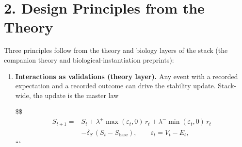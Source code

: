 \documentclass[
]{article}
\begin{document}
\section{2. Design Principles from the
Theory}\label{design-principles-from-the-theory}

Three principles follow from the theory and biology layers of the stack
(the companion theory and biological-instantiation preprints):

\begin{enumerate}
\def\labelenumi{\arabic{enumi}.}
\item
  \textbf{Interactions as validations (theory layer).} Any event with a
  recorded expectation and a recorded outcome can drive the stability
  update. Stack-wide, the update is the master law

  \$\$ \begin{equation}
  \begin{split} S_{t+1} ={}& S_t + \lambda^{+}\max(\varepsilon_t, 0)\,r_t + \lambda^{-}\min(\varepsilon_t, 0)\,r_t \\ & - \delta_S\,(S_t - S_{\mathrm{base}}), \qquad \varepsilon_t = V_t - E_t, \end{split}\label{eq:master}
  \end{equation} ```


\end{enumerate}
\end{document}
